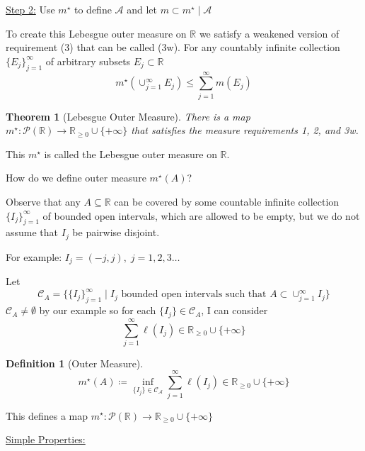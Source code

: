 \documentclass[11pt]{article}
\newtheorem{theorem}{Theorem}[section]
\newtheorem{definition}{Definition}[section]
\newcommand{\pwr}[1]{\mathcal{P}(\mathbb{#1})}
\newcommand{\rinf}{\mathbb{R}_{\geq 0} \cup \{ + \infty \}}
\begin{document}
    \underline{Step 2:} Use $m^{\star}$ to define $\mathcal{A}$ and let $m \subset m^{\star} \mid \mathcal{A}$

    To create this Lebesgue outer measure on $\mathbb{R}$ we satisfy a weakened version of requirement (3) that can be called (3w).
    For any countably infinite collection $\{ E_j \}_{j=1}^{\infty}$ of arbitrary subsets $E_j \subset \mathbb{R}$
    \[
        m^{\star}(\cup_{j=1}^{\infty} E_j) \leq \sum_{j=1}^{\infty} m(E_j)
    \]
    \begin{theorem}[Lebesgue Outer Measure]
        There is a map $m^{\star}: \pwr{R} \rightarrow \rinf $ that satisfies the measure requirements 1, 2, and 3w.
    \end{theorem}

    This $m^{\star}$ is called the Lebesgue outer measure on $\mathbb{R}$.

    How do we define outer measure $m^{\star}(A)$?

    Observe that any $A \subseteq \mathbb{R}$ can be covered by some countable infinite collection $\{ I_j \}_{j=1}^{\infty}$ of bounded open intervals, which are allowed to be empty, but we do not assume that $I_j$ be pairwise disjoint.

    For example: $I_j = (-j, j), \; j=1,2,3\hdots$

    Let
    \[
        \mathcal{C}_A = \{ \{I_j\}_{j=1}^{\infty} \mid I_j \text{ bounded open intervals such that } A \subset \cup_{j=1}^{\infty} I_j \}
    \]
    $\mathcal{C}_A \neq \emptyset$ by our example so for each $\{ I_j \} \in \mathcal{C}_A$, I can consider
    \[
        \sum_{j=1}^{\infty} \ell(I_j) \in \rinf \tag{$\ell$ denotes length}
    \]

    \begin{definition}[Outer Measure]
        \[
            \boxed{m^{\star}(A) \coloneqq \inf_{\{ I_j \} \in \mathcal{C_A}} \sum_{j=1}^{\infty} \ell (I_j)  } \in \rinf
        \]
    \end{definition}

    This defines a map $m^{\star}: \pwr{R} \rightarrow \rinf$

    \underline{Simple Properties:}
\end{document}
